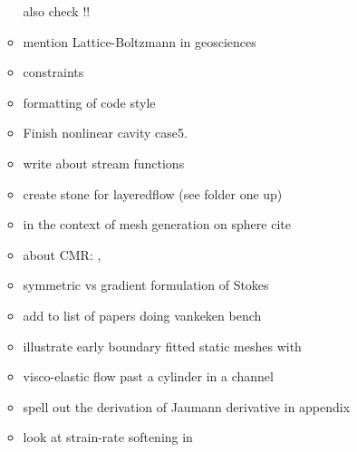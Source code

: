 \begin{itemize}
\begin{itemize}
also check \cite{ensa82} !!
\item mention Lattice-Boltzmann in geosciences \cite{hupc08}
\item constraints \cite{absh79}
\item formatting of code style
\item Finish nonlinear cavity case5.
\item write about stream functions 
\item create stone for layeredflow (see folder one up)
\item in the context of mesh generation on sphere cite \cite{moma19}
\item about CMR: \cite{vaks15},\cite{kott05}
\item symmetric vs gradient formulation of Stokes
\item add \cite{devv00a,dadh07} to list of papers doing vankeken bench
\item illustrate early boundary fitted static meshes with \cite{thar85,boww89,whbw92}
\item visco-elastic flow past a cylinder in a channel \cite{bepo10}
\item \cite{bepo10} spell out the derivation of Jaumann derivative in appendix
\item look at strain-rate softening in \cite{belz02}
\end{itemize}



\end{itemize}
